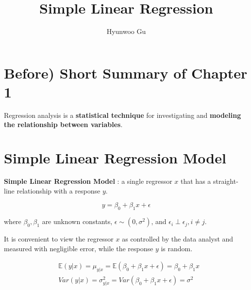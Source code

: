\documentclass[12pt]{article}
\begin{document}
\title{\textbf{Simple Linear Regression}}
\author{Hyunwoo Gu}
\date{}

\maketitle




\section*{Before) Short Summary of Chapter 1}


Regression analysis is a \textbf{statistical technique} for investigating and \textbf{modeling the relationship between variables}.




\section{Simple Linear Regression Model}


\textbf{Simple Linear Regression Model} : a single regressor $x$ that has a straight-line relationship with a response $y$.

$$
y = \beta_0 + \beta_1 x + \epsilon
$$

where $\beta_0, \beta_1$ are unknown constants, $\epsilon \sim (0, \sigma^2)$, and $\epsilon_i \perp \epsilon_j, i \neq j$.

\bigskip
It is convenient to view the regressor $x$ as controlled by the data analyst and measured with negligible error, while the response $y$ is random.

$$
\begin{aligned}
&\mathbb{E}(y | x) = \mu_{y | x} = \mathbb{E} (\beta_0 + \beta_1 x + \epsilon) = \beta_0 + \beta_1 x \\[8pt]
&Var(y | x) = \sigma^2_{y | x} = Var(\beta_0 + \beta_1 x + \epsilon) = \sigma^2
\end{aligned}
$$



\pagebreak
\end{document}
